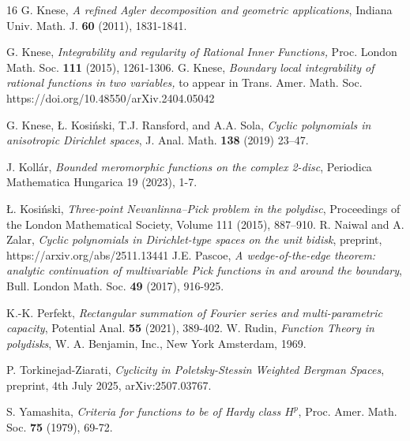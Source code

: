 \documentclass[11pt]{amsart}
\numberwithin{equation}{section}
\begin{document}
\begin{thebibliography}{16}
G. Knese,  \textit{A refined Agler decomposition and geometric applications},  Indiana Univ. Math. J. {\bf 60} (2011), 1831-1841.

 G. Knese, \textit{Integrability and regularity of Rational Inner Functions,} Proc. London Math. Soc. {\bf 111} (2015), 1261-1306.
 G. Knese, \textit{Boundary local integrability of rational functions in two variables,} to appear in Trans. Amer. Math. Soc. 
https://doi.org/10.48550/arXiv.2404.05042

 G. Knese, \L. Kosi\'nski, T.J. Ransford, and A.A. Sola, {\it Cyclic polynomials in anisotropic Dirichlet spaces},  J. Anal. Math. {\bf 138} (2019) 23–47. 

 J. Koll\'ar, \textit{Bounded meromorphic functions on the complex 2-disc}, Periodica Mathematica Hungarica
19 (2023), 1-7.

 \L{}. Kosi\'nski, \textit{Three-point Nevanlinna–Pick problem in the polydisc}, Proceedings of the London Mathematical Society, Volume 111 (2015), 887–910.
R. Naiwal and A. Zalar, \textit{Cyclic polynomials in Dirichlet-type spaces on the unit bidisk}, preprint, https://arxiv.org/abs/2511.13441
J.E. Pascoe, \textit{A wedge-of-the-edge theorem: analytic continuation of multivariable Pick functions in and around the boundary}, Bull. London Math. Soc. {\bf 49} (2017), 916-925.

K.-K. Perfekt, \textit{Rectangular summation of Fourier series and multi-parametric capacity}, Potential Anal. {\bf 55} (2021), 389-402.
 W. Rudin, \textit{Function Theory in polydisks}, W. A. Benjamin, Inc., New York Amsterdam, 1969.

 P. Torkinejad-Ziarati, \textit{Cyclicity in Poletsky-Stessin Weighted Bergman Spaces}, preprint, 4th July 2025, 	arXiv:2507.03767.

S. Yamashita, \emph{Criteria for functions to be of Hardy class $H^p$}, Proc. Amer. Math. Soc. {\bf 75} (1979), 69-72.
\end{thebibliography}
\end{document}
